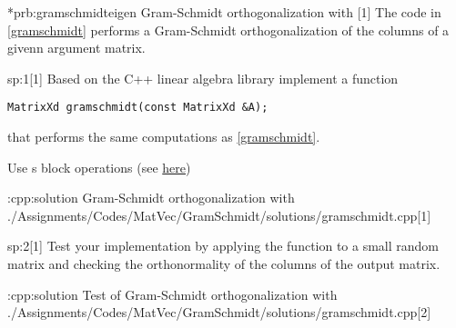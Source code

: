 \begin{samproblem}*{prb:gramschmidteigen}
        {Gram-Schmidt orthogonalization with \eigen{}}[1]{
The code in \cref{gramschmidt} performs a Gram-Schmidt
orthogonalization of the columns of a givenn argument matrix.
}

\begin{subproblem}{sp:1}[1]
  Based on the C++ linear algebra library \eigen{} implement a function
  \begin{lstlisting}[style=cpp]
MatrixXd gramschmidt(const MatrixXd &A);
  \end{lstlisting}
  that performs the same computations as \cref{gramschmidt}.

  \begin{samhint}
    Use \eigen{}s block operations
    (see \href{https://eigen.tuxfamily.org/dox/group__TutorialBlockOperations.html}
    {here})
  \end{samhint}

  \begin{samsolution}
    \begin{samcode}[C++-code]{\cpl:cpp:solution}
        {Gram-Schmidt orthogonalization with \eigen{}}
        \samincludecpp
        {./Assignments/Codes/MatVec/GramSchmidt/solutions/gramschmidt.cpp}[1]
    \end{samcode}
  \end{samsolution}

\end{subproblem}

\begin{subproblem}{sp:2}[1]
  \label{sp:strassen:2}
  Test your implementation by applying the function 
  to a small random matrix
  and checking the orthonormality of the columns of the output
  matrix.

  \begin{samsolution}
    \begin{samcode}[C++-code]{\cpl:cpp:solution}
    {Test of Gram-Schmidt orthogonalization with \eigen{}}
      \samincludecpp
      {./Assignments/Codes/MatVec/GramSchmidt/solutions/gramschmidt.cpp}[2]
    \end{samcode}
  \end{samsolution}

\end{subproblem}

\end{samproblem}

